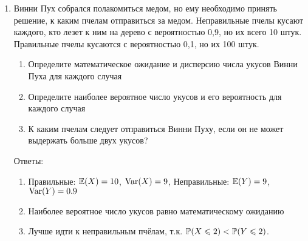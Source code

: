 \documentclass[pdftex,12pt,a4paper]{article}
\begin{document}
\begin{enumerate}
\item Винни Пух собрался полакомиться медом, но ему необходимо принять решение, к каким пчелам отправиться за медом. Неправильные пчелы кусают каждого, кто лезет к ним на дерево с вероятностью 0,9, но их всего 10 штук. Правильные пчелы кусаются с вероятностью 0,1, но их 100 штук.
\begin{enumerate}
\item  Определите математическое ожидание и дисперсию числа укусов Винни Пуха для каждого случая
\item Определите наиболее вероятное число укусов и его вероятность для каждого случая 
\item К каким пчелам следует отправиться Винни Пуху, если он не может выдержать больше двух укусов?   
\end{enumerate}

Ответы:
\begin{enumerate}
\item Правильные: $\E(X)=10$, $\Var(X)=9$, Неправильные: $\E(Y)=9$, $\Var(Y)=0.9$
\item Наиболее вероятное число укусов равно математическому ожиданию
\item Лучше идти к неправильным пчёлам, т.к. $\P(X\leq 2)<\P(Y\leq 2)$.
\end{enumerate}

\end{enumerate}
\end{document}
